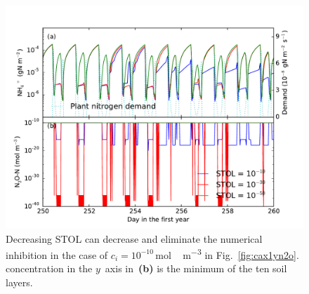 \documentclass[gmdd, online, hvmath]{copernicus}
\begin{document}
\begin{figure}
\includegraphics[width=120mm]{gmd-2015-254-discussions-f08.pdf}
\caption{Decreasing STOL can decrease and eliminate the numerical inhibition in the case of $c_i = 10^{-10}$\,\unit{mol\,m^{-3}}  in Fig.~\ref{fig:cax1yn2o}.  concentration in the $y$~axis in~\textbf{(b)}
 is the minimum of the ten soil layers.}
\label{fig:cax1yn2osto0}
\end{figure}
\end{document}
